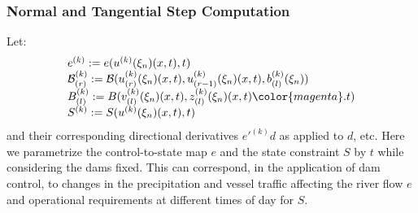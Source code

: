 \documentclass{article}
\newcommand{\1}{\mathds{1}}          %
\theoremstyle{definition}
\begin{document}
\begin{sloppypar}
\subsubsection{Normal and Tangential Step Computation}

Let:
\[
\begin{array}{l}
e^{(k)} := e(u^{(k)}(\xi_n)(x,t),t) \\
\mathcal{B}_{(r)}^{(k)} := \mathcal{B}(u^{(k)}_{(r)}(\xi_n)(x,t),u^{(k)}_{(r-1)}(\xi_n)(x,t),b_{(l)}^{(k)}(\xi_n)) \\
B_{(l)}^{(k)} := B(v_{(l)}^{(k)}(\xi_n)(x,t),z_{(l)}^{(k)}(\xi_n)(x,t){\color{magenta}.t}) \\
S^{(k)} := S(u^{(k)}(\xi_n)(x,t),t) 
\end{array}
\]
and their corresponding directional derivatives $e'^{(k)}d$ as applied to $d$, etc. Here we parametrize the control-to-state map $e$ and the state constraint $S$ by $t$ while considering the dams fixed. This can correspond, in the application of dam control, to changes in the precipitation and vessel traffic affecting the river flow $e$ and operational requirements at different times of day for $S$. 


\end{sloppypar}
\end{document}

